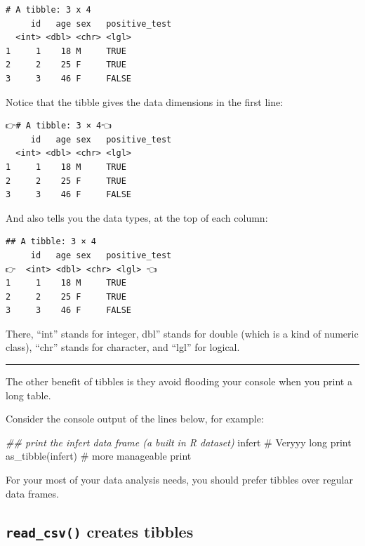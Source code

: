 \documentclass[
  letterpaper,
  DIV=11,
  numbers=noendperiod]{scrreprt}
\newenvironment{Shaded}{\begin{snugshade}}{\end{snugshade}}
\newcommand{\CommentTok}[1]{\textcolor[rgb]{0.37,0.37,0.37}{#1}}
\newcommand{\DocumentationTok}[1]{\textcolor[rgb]{0.37,0.37,0.37}{\textit{#1}}}
\newcommand{\FunctionTok}[1]{\textcolor[rgb]{0.28,0.35,0.67}{#1}}
\newcommand{\NormalTok}[1]{\textcolor[rgb]{0.00,0.23,0.31}{#1}}
\begin{document}
\begin{verbatim}
# A tibble: 3 x 4
     id   age sex   positive_test
  <int> <dbl> <chr> <lgl>        
1     1    18 M     TRUE         
2     2    25 F     TRUE         
3     3    46 F     FALSE        
\end{verbatim}

Notice that the tibble gives the data dimensions in the first line:

\begin{verbatim}
👉# A tibble: 3 × 4👈
     id   age sex   positive_test
  <int> <dbl> <chr> <lgl>        
1     1    18 M     TRUE         
2     2    25 F     TRUE         
3     3    46 F     FALSE  
\end{verbatim}

And also tells you the data types, at the top of each column:

\begin{verbatim}
## A tibble: 3 × 4
     id   age sex   positive_test
👉  <int> <dbl> <chr> <lgl> 👈       
1     1    18 M     TRUE         
2     2    25 F     TRUE         
3     3    46 F     FALSE  
\end{verbatim}

There, ``int'' stands for integer, dbl'' stands for double (which is a
kind of numeric class), ``chr'' stands for character, and ``lgl'' for
logical.

\begin{center}\rule{0.5\linewidth}{0.5pt}\end{center}

The other benefit of tibbles is they avoid flooding your console when
you print a long table.

Consider the console output of the lines below, for example:

\begin{Shaded}
\begin{Highlighting}[]
\DocumentationTok{\#\# print the infert data frame (a built in R dataset)}
\NormalTok{infert }\CommentTok{\# Veryyy long print}
\FunctionTok{as\_tibble}\NormalTok{(infert) }\CommentTok{\# more manageable print}
\end{Highlighting}
\end{Shaded}

For your most of your data analysis needs, you should prefer tibbles
over regular data frames.

\hypertarget{read_csv-creates-tibbles}{%
\subsection{\texorpdfstring{\texttt{read\_csv()} creates
tibbles}{read\_csv() creates tibbles}}\label{read_csv-creates-tibbles}}
\end{document}
